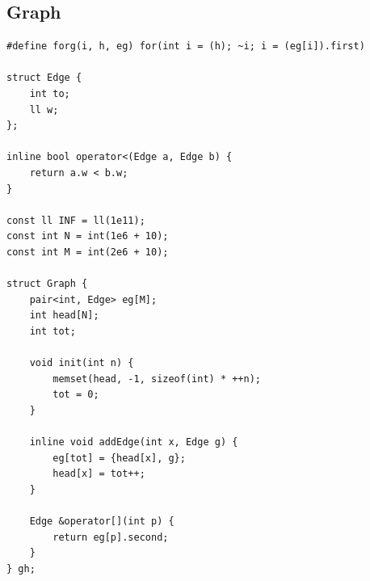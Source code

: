 \documentclass[twoside]{article}
\begin{document}
\subsection{Graph}
\begin{lstlisting}
#define forg(i, h, eg) for(int i = (h); ~i; i = (eg[i]).first)

struct Edge {
    int to;
    ll w;
};

inline bool operator<(Edge a, Edge b) {
    return a.w < b.w;
}

const ll INF = ll(1e11);
const int N = int(1e6 + 10);
const int M = int(2e6 + 10);

struct Graph {
    pair<int, Edge> eg[M];
    int head[N];
    int tot;

    void init(int n) {
        memset(head, -1, sizeof(int) * ++n);
        tot = 0;
    }

    inline void addEdge(int x, Edge g) {
        eg[tot] = {head[x], g};
        head[x] = tot++;
    }
    
    Edge &operator[](int p) {
        return eg[p].second;
    }
} gh;\end{lstlisting}
\end{document}
